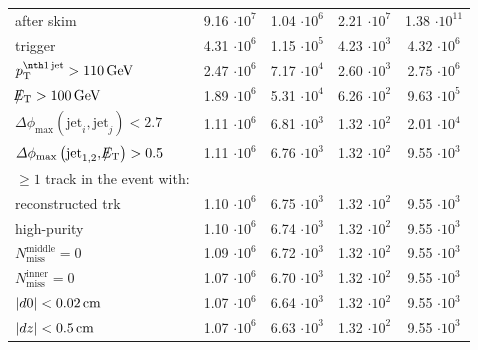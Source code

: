 \begin{table}[!h]
{\begin{tabular}{|l|c|c|c|c|}
after skim                                                                                & 9.16 $\cdot10^{7 }$ & 1.04 $\cdot10^{6 }$ & 2.21 $\cdot10^{7 }$ & 1.38 $\cdot10^{11}$ \\
trigger                                                                                   & 4.31 $\cdot10^{6 }$ & 1.15 $\cdot10^{5 }$ & 4.23 $\cdot10^{3 }$ & 4.32 $\cdot10^{6 }$ \\
$\ptfirstjet>110\gev$                                                                     & 2.47 $\cdot10^{6 }$ & 7.17 $\cdot10^{4 }$ & 2.60 $\cdot10^{3 }$ & 2.75 $\cdot10^{6 }$ \\
$\slash\mkern-12mu{E}_{\text{T}}>100\,\text{Ge}\kern-0.06667em\text{V}$                                                                            & 1.89 $\cdot10^{6 }$ & 5.31 $\cdot10^{4 }$ & 6.26 $\cdot10^{2 }$ & 9.63 $\cdot10^{5 }$ \\
$\Delta\phi_{\text{max}} \left( \text{jet}_i, \text{jet}_j  \right)<2.7$                  & 1.11 $\cdot10^{6 }$ & 6.81 $\cdot10^{3 }$ & 1.32 $\cdot10^{2 }$ & 2.01 $\cdot10^{4 }$ \\
$\Delta\phi_{\text{max}} \left( \text{jet}_{1,2}, \slash\mkern-12mu{E}_{\text{T}}  \right)>0.5$                          & 1.11 $\cdot10^{6 }$ & 6.76 $\cdot10^{3 }$ & 1.32 $\cdot10^{2 }$ & 9.55 $\cdot10^{3 }$ \\
$\geq1$ track in the event with:                                                          &&&&\\
reconstructed trk                                                                         & 1.10 $\cdot10^{6 }$ & 6.75 $\cdot10^{3 }$ & 1.32 $\cdot10^{2 }$ & 9.55 $\cdot10^{3 }$ \\
high-purity                                                                               & 1.10 $\cdot10^{6 }$ & 6.74 $\cdot10^{3 }$ & 1.32 $\cdot10^{2 }$ & 9.55 $\cdot10^{3 }$ \\
$N_{\text{miss}}^{\text{middle}}=0$                                                       & 1.09 $\cdot10^{6 }$ & 6.72 $\cdot10^{3 }$ & 1.32 $\cdot10^{2 }$ & 9.55 $\cdot10^{3 }$ \\
$N_{\text{miss}}^{\text{inner}}=0$                                                        & 1.07 $\cdot10^{6 }$ & 6.70 $\cdot10^{3 }$ & 1.32 $\cdot10^{2 }$ & 9.55 $\cdot10^{3 }$ \\
$|d0|<0.02\,\text{cm}$                                                                            & 1.07 $\cdot10^{6 }$ & 6.64 $\cdot10^{3 }$ & 1.32 $\cdot10^{2 }$ & 9.55 $\cdot10^{3 }$ \\
$|dz|<0.5\,\text{cm}$                                                                             & 1.07 $\cdot10^{6 }$ & 6.63 $\cdot10^{3 }$ & 1.32 $\cdot10^{2 }$ & 9.55 $\cdot10^{3 }$ \\

\end{tabular}}
\end{table}
